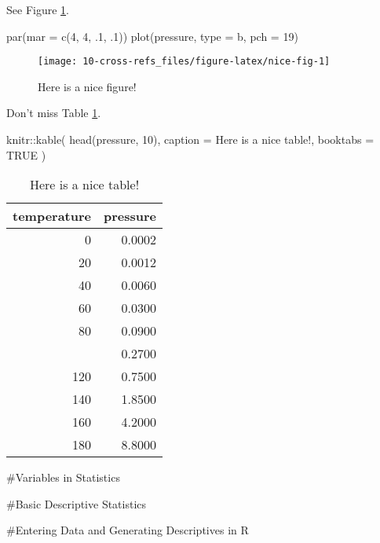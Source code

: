 \documentclass[
]{book}
\newenvironment{Shaded}{\begin{snugshade}}{\end{snugshade}}
\newcommand{\AttributeTok}[1]{\textcolor[rgb]{0.77,0.63,0.00}{#1}}
\newcommand{\ConstantTok}[1]{\textcolor[rgb]{0.00,0.00,0.00}{#1}}
\newcommand{\DecValTok}[1]{\textcolor[rgb]{0.00,0.00,0.81}{#1}}
\newcommand{\FunctionTok}[1]{\textcolor[rgb]{0.00,0.00,0.00}{#1}}
\newcommand{\NormalTok}[1]{#1}
\newcommand{\SpecialCharTok}[1]{\textcolor[rgb]{0.00,0.00,0.00}{#1}}
\newcommand{\StringTok}[1]{\textcolor[rgb]{0.31,0.60,0.02}{#1}}
\begin{document}
See Figure \ref{fig:nice-fig}.

\begin{Shaded}
\begin{Highlighting}[]
\FunctionTok{par}\NormalTok{(}\AttributeTok{mar =} \FunctionTok{c}\NormalTok{(}\DecValTok{4}\NormalTok{, }\DecValTok{4}\NormalTok{, .}\DecValTok{1}\NormalTok{, .}\DecValTok{1}\NormalTok{))}
\FunctionTok{plot}\NormalTok{(pressure, }\AttributeTok{type =} \StringTok{\textquotesingle{}b\textquotesingle{}}\NormalTok{, }\AttributeTok{pch =} \DecValTok{19}\NormalTok{)}
\end{Highlighting}
\end{Shaded}

\begin{figure}

{\centering \texttt{[image: 10-cross-refs\_files/figure-latex/nice-fig-1]} 

}

\caption{Here is a nice figure!}\label{fig:nice-fig}
\end{figure}

Don't miss Table \ref{tab:nice-tab}.

\begin{Shaded}
\begin{Highlighting}[]
\NormalTok{knitr}\SpecialCharTok{::}\FunctionTok{kable}\NormalTok{(}
  \FunctionTok{head}\NormalTok{(pressure, }\DecValTok{10}\NormalTok{), }\AttributeTok{caption =} \StringTok{\textquotesingle{}Here is a nice table!\textquotesingle{}}\NormalTok{,}
  \AttributeTok{booktabs =} \ConstantTok{TRUE}
\NormalTok{)}
\end{Highlighting}
\end{Shaded}

\begin{table}

\caption{\label{tab:nice-tab}Here is a nice table!}
\centering
\begin{tabular}[t]{rr}
\toprule
temperature & pressure\\
\midrule
0 & 0.0002\\
20 & 0.0012\\
40 & 0.0060\\
60 & 0.0300\\
80 & 0.0900\\
\addlinespace
100 & 0.2700\\
120 & 0.7500\\
140 & 1.8500\\
160 & 4.2000\\
180 & 8.8000\\
\bottomrule
\end{tabular}
\end{table}

\#Variables in Statistics

\#Basic Descriptive Statistics

\#Entering Data and Generating Descriptives in R

  
\end{document}
